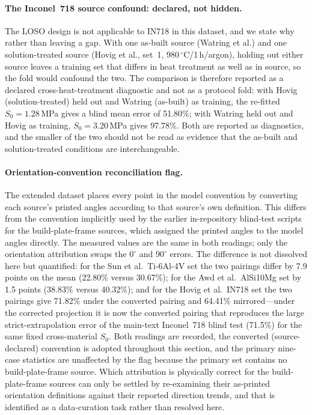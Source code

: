 \documentclass[11pt,a4paper,twocolumn]{article}
\providecommand{\ang}[1]{\ensuremath{#1^{\circ}}}
\begin{document}
\paragraph{The Inconel~718 source confound: declared, not hidden.}
The LOSO design is not applicable to IN718 in this dataset, and we state why rather than leaving a gap.
With one as-built source (Watring et al.) and one solution-treated source (Hovig et al., set~1,
980\,$^\circ$C/1\,h/argon), holding out either source leaves a training set that differs in heat treatment
as well as in source, so the fold would confound the two. The comparison is therefore reported as a
declared cross-heat-treatment diagnostic and not as a protocol fold: with Hovig (solution-treated) held
out and Watring (as-built) as training, the re-fitted $S_0 = 1.28$\,MPa gives a blind mean error of
51.80\%; with Watring held out and Hovig as training, $S_0 = 3.20$\,MPa gives 97.78\%. Both are reported
as diagnostics, and the smaller of the two should not be read as evidence that the as-built and
solution-treated conditions are interchangeable.

\paragraph{Orientation-convention reconciliation flag.}
The extended dataset places every point in the model convention by converting each source's printed
angles according to that source's own definition. This differs from the convention implicitly used by the
earlier in-repository blind-test scripts for the build-plate-frame sources, which assigned the printed
angles to the model angles directly. The measured values are the same in both readings; only the
orientation attribution swaps the $\ang{0}$ and $\ang{90}$ errors. The difference is not dissolved here
but quantified: for the Sun et al.\ Ti-6Al-4V set the two pairings differ by 7.9 points on the mean
(22.80\% versus 30.67\%); for the Awd et al.\ AlSi10Mg set by 1.5 points (38.83\% versus 40.32\%); and
for the Hovig et al.\ IN718 set the two pairings give 71.82\% under the converted pairing and 64.41\%
mirrored---under the corrected projection it is now the converted pairing that reproduces the large
strict-extrapolation error of the main-text Inconel~718 blind test (71.5\%) for the same fixed cross-material $S_0$. Both readings are recorded, the converted
(source-declared) convention is adopted throughout this section, and the primary nine-case statistics
are unaffected by the flag because the primary set contains no build-plate-frame source. Which
attribution is physically correct for the build-plate-frame sources can only be settled by re-examining
their as-printed orientation definitions against their reported direction trends, and that is identified
as a data-curation task rather than resolved here.
\end{document}

